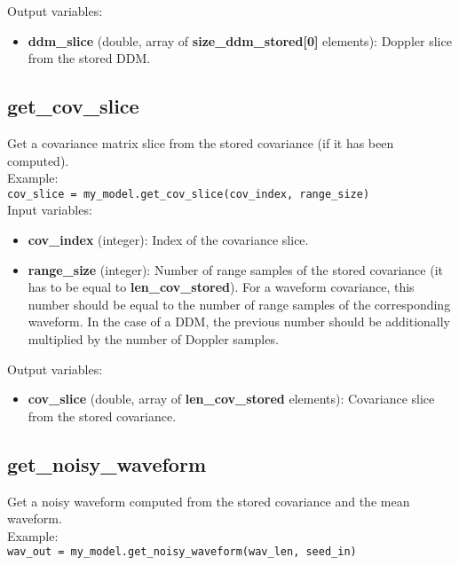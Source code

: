 Output variables:
\begin{itemize}
\item {\bf ddm\_slice} (double, array of {\bf size\_ddm\_stored[0]} elements): Doppler slice from the stored DDM.
\end{itemize}


\subsection{get\_cov\_slice}

Get a covariance matrix slice from the stored covariance (if it has been computed).\\

Example:\\

\texttt{cov\_slice = my\_model.get\_cov\_slice(cov\_index, range\_size)}\\

Input variables:
\begin{itemize}
\item {\bf cov\_index} (integer): Index of the covariance slice.
\item {\bf range\_size} (integer): Number of range samples of the stored covariance (it has to be equal to {\bf len\_cov\_stored}). For a waveform covariance, this number should be equal to the number of range samples of the corresponding waveform. In the case of a DDM, the previous number should be additionally multiplied by the number of Doppler samples.
\end{itemize}

Output variables:
\begin{itemize}
\item {\bf cov\_slice} (double, array of {\bf len\_cov\_stored} elements): Covariance slice from the stored covariance.
\end{itemize}


\subsection{get\_noisy\_waveform}

Get a noisy waveform computed from the stored covariance and the mean waveform.\\

Example:\\

\texttt{wav\_out = my\_model.get\_noisy\_waveform(wav\_len, seed\_in)}\\

